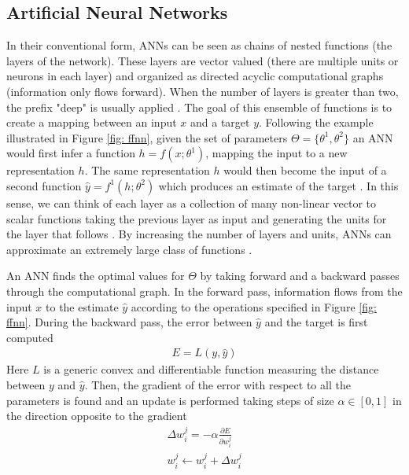 \subsection{Artificial Neural Networks}
\label{artificial_neural_networks}
In their conventional form, ANNs can be seen as chains of nested functions (the layers of the network). These layers are vector valued (there are multiple units or neurons in each layer) and organized as directed acyclic computational graphs (information only flows forward). When the number of layers is greater than two, the prefix "deep" is usually applied \cite{bengio2017deep}. The goal of this ensemble of functions is to create a mapping between an input $x$ and a target $y$. Following the example illustrated in Figure \ref{fig: ffnn}, given the set of parameters $\Theta = \{\theta^1, \theta^2 \}$ an ANN would first infer a function $h = f(x;\theta^{1})$, mapping the input to a new representation $h$. The same representation $h$ would then become the input of a second function $\widehat{y} = f^{1}(h;\theta^{2})$ which produces an estimate of the target \cite{bengio2017deep}. In this sense, we can think of each layer as a collection of many non-linear vector to scalar functions taking the previous layer as input and generating the units for the layer that follows \cite{bengio2017deep}. By increasing the number of layers and units, ANNs can approximate an extremely large class of functions \cite{rumelhart1986learning}.

An ANN finds the optimal values for $\Theta$ by taking forward and a backward passes through the computational graph. In the forward pass, information flows from the input $x$ to the estimate $\widehat{y}$ according to the operations specified in Figure \ref{fig: ffnn}. During the backward pass, the error between $\widehat{y}$ and the target is first computed
\begin{gather}
\label{loss}
    E =  L(y, \widehat{y})
\end{gather}
Here $L$ is a generic convex and differentiable function measuring the distance between $y$ and $\widehat{y}$. Then, the gradient of the error with respect to all the parameters is found and an update is performed taking steps of size $\alpha \in [0, 1]$ in the direction opposite to the gradient
\begin{gather}
\label{delta_rule}
    \Delta w^{j}_{i} = -\alpha\frac{\partial E}{\partial w^{j}_{i}} \\
    w^{j}_{i} \leftarrow w^{j}_{i} + \Delta w^{j}_{i} \nonumber
\end{gather}
